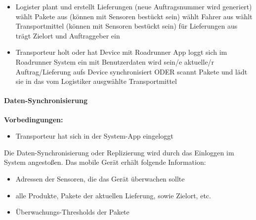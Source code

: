 \begin{appendix}
\begin{itemize}
		\item Logister plant und erstellt Lieferungen (neue Auftragsnummer wird
		generiert) \subitem wählt Pakete aus (können mit Sensoren bestückt sein)
			\subitem wählt Fahrer aus 
			\subitem wählt Transportmittel (können mit Sensoren bestückt sein) für
			Lieferungen aus
			\subitem trägt Zielort und Auftraggeber ein

	  \item Transporteur
	  	\subitem holt oder hat Device mit Roadrunner App
	  	\subitem loggt sich im Roadrunner System ein
	  		\subsubitem mit Benutzerdaten wird sein/e aktuelle/r Auftrag/Lieferung aufs
	  		Device synchronisiert ODER 
	  		\subsubitem scannt Pakete und lädt sie in das vom Logistiker ausgwählte
	  		Transportmittel
	\end{itemize}

	\paragraph{Daten-Synchronisierung}
		\textbf{Vorbedingungen: }
		\begin{itemize}
		  \item Transporteur hat sich in der System-App eingeloggt
		\end{itemize}

		Die Daten-Synchronisierung oder Replizierung wird durch das Einloggen im
		System angestoßen. Das mobile Gerät erhält folgende Information:
		\begin{itemize}
		  \item Adressen der Sensoren, die das Gerät überwachen sollte
		  \item alle Produkte, Pakete der aktuellen Lieferung, sowie Zielort, etc.
		  \item Überwachungs-Thresholds der Pakete
		\end{itemize}
	\par



	
\end{appendix}
